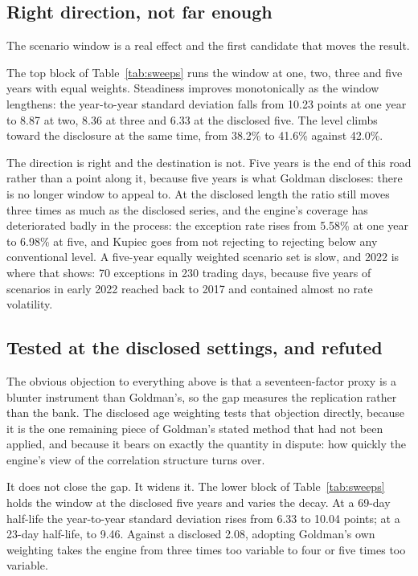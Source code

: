 \subsection{Right direction, not far enough}

The scenario window is a real effect and the first candidate that moves the
result.

The top block of Table~\ref{tab:sweeps} runs the window at one, two, three and
five years with equal weights. Steadiness improves monotonically as the window
lengthens: the year-to-year standard deviation falls from 10.23 points at one
year to 8.87 at two, 8.36 at three and 6.33 at the disclosed five. The level
climbs toward the disclosure at the same time, from 38.2\% to 41.6\% against
42.0\%.



The direction is right and the destination is not. Five years is the end of
this road rather than a point along it, because five years is what Goldman
discloses: there is no longer window to appeal to. At the disclosed length
the ratio still moves three times as much as the disclosed series, and the
engine's coverage has deteriorated badly in the process: the exception rate
rises from 5.58\% at one year to 6.98\% at five, and Kupiec goes from not
rejecting to rejecting below any conventional level. A five-year equally
weighted scenario set is slow, and 2022 is where that shows: 70 exceptions in
230 trading days, because five years of scenarios in early 2022 reached back
to 2017 and contained almost no rate volatility.

\subsection{Tested at the disclosed settings, and refuted}

The obvious objection to everything above is that a seventeen-factor proxy is a
blunter instrument than Goldman's, so the gap measures the replication rather
than the bank. The disclosed age weighting tests that objection directly,
because it is the one remaining piece of Goldman's stated method that had not
been applied, and because it bears on exactly the quantity in dispute: how
quickly the engine's view of the correlation structure turns over.

It does not close the gap. It widens it. The lower block of
Table~\ref{tab:sweeps} holds the window at the disclosed five years and varies
the decay. At a 69-day half-life the year-to-year standard deviation rises from
6.33 to 10.04 points; at a 23-day half-life, to 9.46. Against a disclosed 2.08,
adopting Goldman's own weighting takes the engine from three times too variable
to four or five times too variable.

